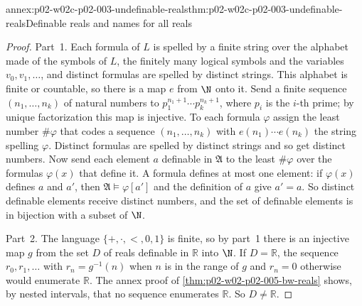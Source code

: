 \begin{annexitem}{annex:p02-w02c-p02-003-undefinable-reals}{thm:p02-w02c-p02-003-undefinable-reals}{Definable reals and names for all reals}
\begin{proof}
Part~1.  Each formula of \(L\) is spelled by a finite string over the
alphabet made of the symbols of \(L\), the finitely many logical symbols
and the variables \(v_0,v_1,\ldots\), and distinct formulas are spelled by
distinct strings.  This alphabet is
finite or countable, so there is a map \(e\) from \(\N\) onto it.  Send a
finite sequence \((n_1,\ldots,n_k)\) of natural numbers to
\(p_1^{n_1+1}\cdots p_k^{n_k+1}\), where \(p_i\) is the \(i\)-th prime; by
unique factorization this map is injective.  To each formula \(\varphi\)
assign the least number \(\#\varphi\) that codes a sequence
\((n_1,\ldots,n_k)\) with \(e(n_1)\cdots e(n_k)\) the string spelling \(\varphi\).
Distinct formulas are spelled by distinct strings and so get distinct
numbers.  Now
send each element \(a\) definable in \(\mathfrak A\) to the least
\(\#\varphi\) over the formulas \(\varphi(x)\) that define it.  A formula
defines at most one element: if \(\varphi(x)\) defines \(a\) and \(a'\),
then \(\mathfrak A\models\varphi[a']\) and the definition of \(a\) give
\(a'=a\).  So distinct definable elements receive distinct numbers, and
the set of definable elements is in bijection with a subset of \(\N\).

Part~2.  The language \(\{+,\cdot,<,0,1\}\) is finite, so by part~1 there
is an injective map \(g\) from the set \(D\) of reals definable in
\(\mathbb R\) into \(\N\).  If \(D=\mathbb R\), the sequence
\(r_0,r_1,\ldots\) with \(r_n=g^{-1}(n)\) when \(n\) is in the range of
\(g\) and \(r_n=0\) otherwise would enumerate \(\mathbb R\).  The annex
proof of \cref{thm:p02-w02-p02-005-bw-reals} shows, by nested intervals,
that no sequence enumerates \(\mathbb R\).  So \(D\neq\mathbb R\).


\end{proof}
\end{annexitem}
